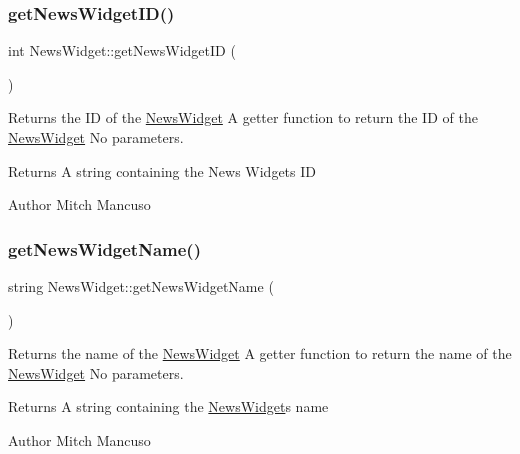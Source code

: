 \subsubsection{\texorpdfstring{get\+News\+Widget\+I\+D()}{getNewsWidgetID()}}
{\footnotesize\ttfamily int News\+Widget\+::get\+News\+Widget\+ID (\begin{DoxyParamCaption}{ }\end{DoxyParamCaption})}



Returns the ID of the \mbox{\hyperlink{class_news_widget}{News\+Widget}}  A getter function to return the ID of the \mbox{\hyperlink{class_news_widget}{News\+Widget}}  No parameters. 

\begin{DoxyReturn}{Returns}
A string containing the News Widget\textquotesingle{}s ID 
\end{DoxyReturn}
\begin{DoxyAuthor}{Author}
Mitch Mancuso 
\end{DoxyAuthor}
\mbox{\label{class_news_widget_a0af651adfe7c7edb7f8063589162de8f}} 
\subsubsection{\texorpdfstring{get\+News\+Widget\+Name()}{getNewsWidgetName()}}
{\footnotesize\ttfamily string News\+Widget\+::get\+News\+Widget\+Name (\begin{DoxyParamCaption}{ }\end{DoxyParamCaption})}



Returns the name of the \mbox{\hyperlink{class_news_widget}{News\+Widget}}  A getter function to return the name of the \mbox{\hyperlink{class_news_widget}{News\+Widget}}  No parameters. 

\begin{DoxyReturn}{Returns}
A string containing the \mbox{\hyperlink{class_news_widget}{News\+Widget}}\textquotesingle{}s name 
\end{DoxyReturn}
\begin{DoxyAuthor}{Author}
Mitch Mancuso 
\end{DoxyAuthor}
\mbox{\label{class_news_widget_adb74146c7a393d38c6a883bed0fb1012}} 
